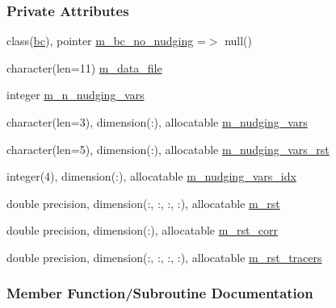 \subsubsection*{Private Attributes}
\begin{DoxyCompactItemize}
\item 
class(\mbox{\hyperlink{structbc__mod_1_1bc}{bc}}), pointer \mbox{\hyperlink{structnudging__mod_1_1nudging_a07ce30551ce62c0cfebc1a58f1eb3505}{m\+\_\+bc\+\_\+no\+\_\+nudging}} =$>$ null()
\item 
character(len=11) \mbox{\hyperlink{structnudging__mod_1_1nudging_a11b6f9de7a9016ea2e0d6bda207283e7}{m\+\_\+data\+\_\+file}}
\item 
integer \mbox{\hyperlink{structnudging__mod_1_1nudging_a955cb9db8203eea771bcc84337749479}{m\+\_\+n\+\_\+nudging\+\_\+vars}}
\item 
character(len=3), dimension(\+:), allocatable \mbox{\hyperlink{structnudging__mod_1_1nudging_a950f514cbfd66b5cb026e5cff2102237}{m\+\_\+nudging\+\_\+vars}}
\item 
character(len=5), dimension(\+:), allocatable \mbox{\hyperlink{structnudging__mod_1_1nudging_a6a6dc13291b73ea301df0029f4119e32}{m\+\_\+nudging\+\_\+vars\+\_\+rst}}
\item 
integer(4), dimension(\+:), allocatable \mbox{\hyperlink{structnudging__mod_1_1nudging_ac0db1fedd6bbda8fec4467aa3fe62f9b}{m\+\_\+nudging\+\_\+vars\+\_\+idx}}
\item 
double precision, dimension(\+:, \+:, \+:, \+:), allocatable \mbox{\hyperlink{structnudging__mod_1_1nudging_a43dce8fb2e392f219ebc72b28c132275}{m\+\_\+rst}}
\item 
double precision, dimension(\+:), allocatable \mbox{\hyperlink{structnudging__mod_1_1nudging_a288c57246c5970dcc1a0792820841383}{m\+\_\+rst\+\_\+corr}}
\item 
double precision, dimension(\+:, \+:, \+:, \+:), allocatable \mbox{\hyperlink{structnudging__mod_1_1nudging_a3b5a939200dee21d8897f48a44d1454a}{m\+\_\+rst\+\_\+tracers}}
\end{DoxyCompactItemize}


\subsubsection{Member Function/\+Subroutine Documentation}
\mbox{\label{structnudging__mod_1_1nudging_ade178a579111036782c7b4570018f0d5}} 
